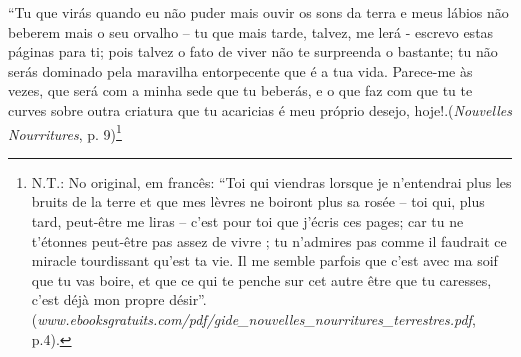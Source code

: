 ``Tu que virás quando eu não puder mais ouvir os sons da terra e meus
lábios não beberem mais o seu orvalho -- tu que mais tarde, talvez, me
lerá - escrevo estas páginas para ti; pois talvez o fato de viver não te
surpreenda o bastante; tu não serás dominado pela maravilha entorpecente
que é a tua vida. Parece-me às vezes, que será com a minha sede que tu
beberás, e o que faz com que tu te curves sobre outra criatura que tu
acaricias é meu próprio desejo, hoje!.(\emph{Nouvelles Nourritures}, p.
9)\footnote{N.T.: No original, em francês: ``Toi qui viendras lorsque je
  n'entendrai plus les bruits de la terre et que mes lèvres ne boiront
  plus sa rosée -- toi qui, plus tard, peut-être me liras -- c'est pour
  toi que j'écris ces pages; car tu ne t'étonnes peut-être pas assez de
  vivre ; tu n'admires pas comme il faudrait ce miracle tourdissant
  qu'est ta vie. Il me semble parfois que c'est avec ma soif que tu vas
  boire, et que ce qui te penche sur cet autre être que tu caresses,
  c'est déjà mon propre désir''.
  (\emph{www.ebooksgratuits.com/pdf/gide\_nouvelles\_nourritures\_terrestres.pdf},
  p.4).}
